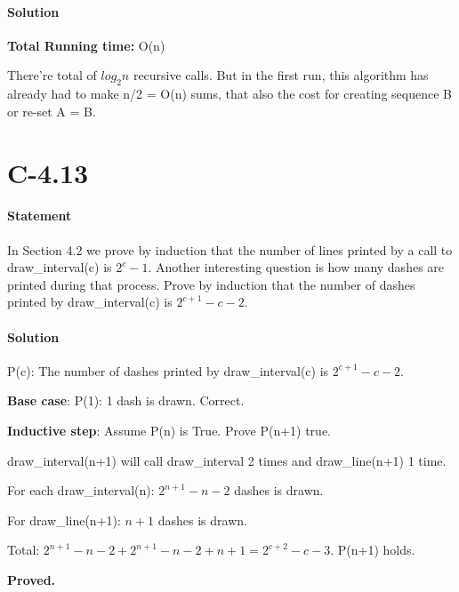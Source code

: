 \documentclass{article}
\begin{document}
  \paragraph{Solution}
    \textbf{Total Running time:} O(n)\par
    There're total of $log_{2}n$ recursive calls. But in the first run, this algorithm has already had to make n/2 = O(n) sums, that also the cost for creating sequence B or re-set A = B.
\section{C-4.13}
  \paragraph{Statement}
  In Section 4.2 we prove by induction that the number of lines printed by a call to draw\_interval(c) is $2^c -1$. Another interesting question is how many dashes are printed during that process. Prove by induction that the number of dashes printed by draw\_interval(c) is $2^{c+1}-c-2$. 
  \paragraph{Solution}
  P(c): The number of dashes printed by draw\_interval(c) is $2^{c+1}-c-2$.\par
  \textbf{Base case}: P(1): 1 dash is drawn. Correct.\par
  \textbf{Inductive step}: Assume P(n) is True. Prove P(n+1) true.\par
  draw\_interval(n+1) will call draw\_interval 2 times and draw\_line(n+1) 1 time.\par
  For each draw\_interval(n): $2^{n+1}-n-2$ dashes is drawn.\par
  For draw\_line(n+1): $n+1$ dashes is drawn.\par
  Total: $2^{n+1}-n-2 + 2^{n+1}-n-2 + n +1 = 2^{c+2} - c - 3$. P(n+1) holds.\par
  \textbf{Proved.}
  
\end{document}
